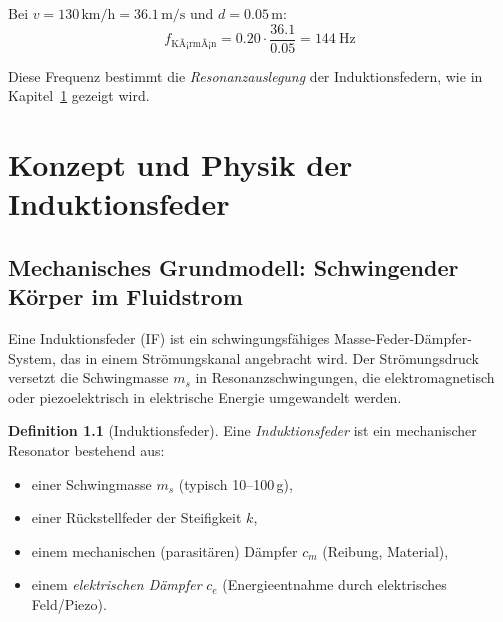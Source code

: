 ﻿\documentclass[12pt, a4paper]{report}
\theoremstyle{definition}
\newtheorem{definition}[theorem]{Definition}
\theoremstyle{remark}
\begin{document}
Bei $v = 130\,\text{km/h} = 36.1\,\text{m/s}$ und $d = 0.05\,\text{m}$:
\begin{equation}
  f_{\text{KÃ¡rmÃ¡n}} = 0.20 \cdot \frac{36.1}{0.05} = \SI{144}{\hertz}
  \label{eq:f_karman_130}
\end{equation}

Diese Frequenz bestimmt die \emph{Resonanzauslegung} der Induktionsfedern,
wie in Kapitel~\ref{chap:federsystem} gezeigt wird.

\chapter{Konzept und Physik der Induktionsfeder}
\label{chap:federsystem}

\section{Mechanisches Grundmodell: Schwingender Körper im Fluidstrom}

Eine Induktionsfeder (IF) ist ein schwingungsfähiges Masse-Feder-Dämpfer-System,
das in einem Strömungskanal angebracht wird. Der Strömungsdruck versetzt die
Schwingmasse $m_s$ in Resonanzschwingungen, die elektromagnetisch oder
piezoelektrisch in elektrische Energie umgewandelt werden.

\begin{definition}[Induktionsfeder]
  Eine \emph{Induktionsfeder} ist ein mechanischer Resonator bestehend aus:
  \begin{itemize}
    \item einer Schwingmasse $m_s$ (typisch 10--100\,g),
    \item einer Rückstellfeder der Steifigkeit $k$,
    \item einem mechanischen (parasitären) Dämpfer $c_m$ (Reibung, Material),
    \item einem \emph{elektrischen Dämpfer} $c_e$ (Energieentnahme durch
          elektrisches Feld/Piezo).
  \end{itemize}
\end{definition}
\end{document}
